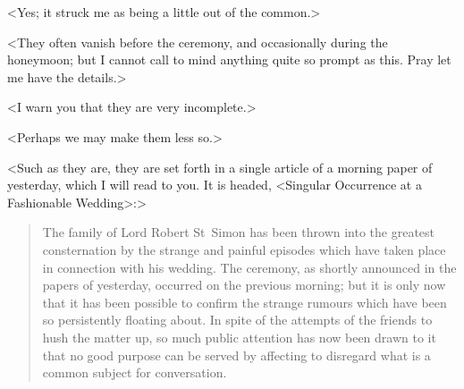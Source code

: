 <Yes; it struck me as being a little out of the common.>

<They often vanish before the ceremony, and occasionally during the honeymoon; but I cannot call to mind anything quite so prompt as this. Pray let me have the details.>

<I warn you that they are very incomplete.>

<Perhaps we may make them less so.>

<Such as they are, they are set forth in a single article of a morning paper of yesterday, which I will read to you. It is headed, <Singular Occurrence at a Fashionable Wedding>:>

\begin{quotation}
The family of Lord Robert St~Simon has been thrown into the greatest consternation by the strange and painful episodes which have taken place in connection with his wedding. The ceremony, as shortly announced in the papers of yesterday, occurred on the previous morning; but it is only now that it has been possible to confirm the strange rumours which have been so persistently floating about. In spite of the attempts of the friends to hush the matter up, so much public attention has now been drawn to it that no good purpose can be served by affecting to disregard what is a common subject for conversation.


\end{quotation}
